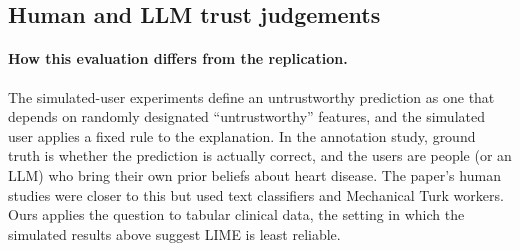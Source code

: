 \subsection{Human and LLM trust judgements}
\label{sec:humanres}


\paragraph{How this evaluation differs from the replication.} The simulated-user experiments define an untrustworthy prediction as one that depends on randomly designated ``untrustworthy'' features, and the simulated user applies a fixed rule to the explanation. In the annotation study, ground truth is whether the prediction is actually correct, and the users are people (or an LLM) who bring their own prior beliefs about heart disease. The paper's human studies were closer to this but used text classifiers and Mechanical Turk workers. Ours applies the question to tabular clinical data, the setting in which the simulated results above suggest LIME is least reliable.
